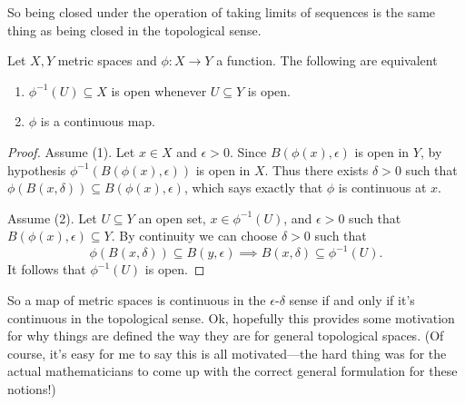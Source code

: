 So being closed under the operation of taking limits of sequences is
the same thing as being closed in the topological sense.

\begin{proposition}
  Let $X, Y$ metric spaces and $\phi : X \to Y$ a function. The
  following are equivalent
  \begin{enumerate}
  \item $\phi^{-1}(U) \subseteq X$ is open whenever $U \subseteq Y$ is
    open.
  \item $\phi$ is a continuous map.
  \end{enumerate}
\end{proposition}

\begin{proof}
  Assume (1). Let $x \in X$ and $\epsilon > 0$. Since
  $B(\phi(x),\epsilon)$ is open in $Y$, by hypothesis
  $\phi^{-1}(B(\phi(x), \epsilon))$ is open in $X$. Thus there exists
  $\delta > 0$ such that $\phi(B(x, \delta)) \subseteq B(\phi(x),
  \epsilon)$, which says exactly that $\phi$ is continuous at $x$.

  \medskip
  Assume (2). Let $U \subseteq Y$ an open set, $x \in \phi^{-1}(U)$,
  and $\epsilon > 0$ such that $B(\phi(x),\epsilon) \subseteq Y$. By
  continuity we can choose $\delta > 0$ such that
  \[
  \phi(B(x,\delta)) \subseteq B(y,\epsilon) \implies B(x,\delta)
  \subseteq \phi^{-1}(U).
  \]
  It follows that $\phi^{-1}(U)$ is open.
\end{proof}

So a map of metric spaces is continuous in the $\epsilon$-$\delta$
sense if and only if it's continuous in the topological sense. Ok,
hopefully this provides some motivation for why things are defined the
way they are for general topological spaces. (Of course, it's easy for
me to say this is all motivated---the hard thing was for the actual
mathematicians to come up with the correct general formulation for
these notions!)




